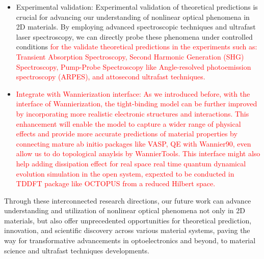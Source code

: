 \begin{itemize}
	\item Experimental validation: Experimental validation of theoretical predictions is crucial for advancing our understanding of nonlinear optical phenomena in 2D materials. By employing advanced spectroscopic techniques and ultrafast laser spectroscopy, we can directly probe these phenomena under controlled conditions \textcolor{red}{for the validate theoretical predictions in the experiments such as: Transient Absorption Spectroscopy, Second Harmonic Generation (SHG) Spectroscopy, Pump-Probe Spectroscopy like Angle-resolved photoemission spectroscopy (ARPES), and attosecond ultrafast techniques.}

	\item \textcolor{red}{Integrate with Wannierization interface: As we introduced before, with the interface of Wannierization, the tight-binding model can be further improved by incorporating more realistic electronic structures and interactions. This enhancement will enable the model to capture a wider range of physical effects and provide more accurate predictions of material properties by connecting mature ab initio packages like VASP, QE with Wannier90, even allow us to do topological anaylsis by WannierTools. This interface might also help adding dissipation effect for real space real time quantum dynamical evolution simulation in the open system, expexted to be conducted in \gls{TDDFT} package like OCTOPUS from a reduced Hilbert space.}

\end{itemize}
Through these interconnected research directions, our future work can advance understanding and utilization of nonlinear optical phenomena not only in 2D materials, but also offer unprecedented opportunities for theoretical prediction, innovation, and scientific discovery across various material systems, paving the way for transformative advancements in optoelectronics and beyond, to material science and ultrafast techniques developments.

